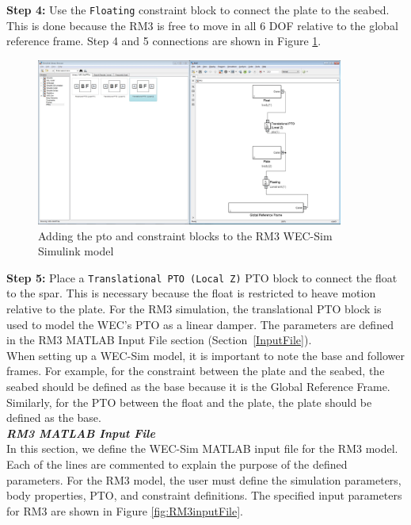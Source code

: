 \textbf{Step 4:} Use the \texttt{Floating} constraint block to connect the plate to the seabed. This is done because the RM3 is free to move in all 6 DOF relative to the global reference frame. Step 4 and 5 connections are shown in Figure \ref{RM3_WECSim}. 

        \begin{figure}[H]
        \centering
        \includegraphics[width=0.9\textwidth]{application/images/RM3_WECSim}
        \caption{Adding the pto and constraint blocks to the RM3 WEC-Sim Simulink model}
        \label{RM3_WECSim}
        \end{figure}

\textbf{Step 5:} Place a \texttt{Translational PTO (Local Z)} PTO block to connect the float to the spar. This is necessary because the float is restricted to heave motion relative to the plate. For the RM3 simulation, the translational PTO block is used to model the WEC's PTO as a linear damper. The parameters are defined in the RM3 MATLAB Input File section (Section~\ref{InputFile}). \\

When setting up a WEC-Sim model, it is important to note the base and follower frames. For example, for the constraint between the plate and the seabed, the seabed should be defined as the base because it is the Global Reference Frame.  Similarly, for the PTO between the float and the plate, the plate should be defined as the base.\\

\textbf{\textit{RM3 MATLAB Input File}}\label{InputFile}\\
In this section, we define the WEC-Sim MATLAB input file for the RM3 model. Each of the lines are commented to explain the purpose of the defined parameters. For the RM3 model, the user must define the simulation parameters, body properties, PTO, and constraint definitions. The specified input parameters for RM3 are shown in Figure \ref{fig:RM3inputFile}. \\

